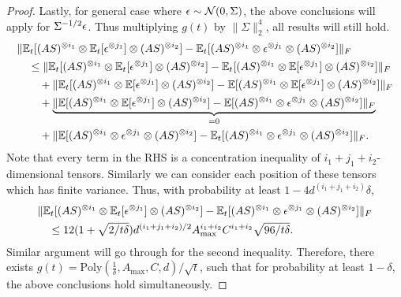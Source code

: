 \begin{proof}
	Lastly, for general case where $\epsilon\sim {\cal{N}}(0,\Sigma)$, the above conclusions will apply for $\Sigma^{-1/2}\epsilon$. Thus multiplying  $g(t)$ by $ \|\Sigma\|^4_2$, all results will still hold. 
	\begin{align*}
	&\|\mathbb{E}_t[(AS)^{\otimes i_1}\otimes \mathbb{E}_t[\epsilon^{\otimes j_1}] \otimes (AS)^{\otimes i_2}] - \mathbb{E}_t[(AS)^{\otimes i_1}\otimes \epsilon^{\otimes j_1}\otimes (AS)^{\otimes i_2}]  \|_F \\
	& \quad \le  \|\mathbb{E}_t[(AS)^{\otimes i_1}\otimes \mathbb{E}_t[\epsilon^{\otimes j_1}] \otimes (AS)^{\otimes i_2}] - \mathbb{E}_t[(AS)^{\otimes i_1}\otimes \mathbb{E}[\epsilon^{\otimes j_1}] \otimes (AS)^{\otimes i_2}] \|_F \\
	& \quad \quad + \| \mathbb{E}_t[(AS)^{\otimes i_1}\otimes \mathbb{E}[\epsilon^{\otimes j_1}] \otimes (AS)^{\otimes i_2}] - \mathbb{E}[(AS)^{\otimes i_1}\otimes \mathbb{E}[\epsilon^{\otimes j_1}] \otimes (AS)^{\otimes i_2}] \|_F \\
	& \quad \quad + \underbrace{\|\mathbb{E}[(AS)^{\otimes i_1}\otimes \mathbb{E}[\epsilon^{\otimes j_1}] \otimes (AS)^{\otimes i_2}]  - \mathbb{E}[(AS)^{\otimes i_1}\otimes \epsilon^{\otimes j_1}\otimes (AS)^{\otimes i_2}] \|_F}_{=0} \\
	& \quad \quad + \| \mathbb{E}[(AS)^{\otimes i_1}\otimes \epsilon^{\otimes j_1}\otimes (AS)^{\otimes i_2}] - \mathbb{E}_t[(AS)^{\otimes i_1}\otimes \epsilon^{\otimes j_1}\otimes (AS)^{\otimes i_2}] \|_F.
	\end{align*}
	Note that every term in the RHS is a concentration inequality of $i_1+j_1+i_2$-dimensional tensors. Similarly we can consider each position of these tensors which has finite variance.
	Thus, with probability at least $1- 4d^{(i_1+j_1+i_2)}\delta$,   
	\begin{align*}
	& \|\mathbb{E}_t[(AS)^{\otimes i_1}\otimes \mathbb{E}_t[\epsilon^{\otimes j_1}] \otimes (AS)^{\otimes i_2}] - \mathbb{E}_t[(AS)^{\otimes i_1}\otimes \epsilon^{\otimes j_1}\otimes (AS)^{\otimes i_2}]  \|_F \\
	& \quad \le
	12(1+\sqrt{2/t\delta})d^{(i_1+j_1+i_2)/2}A_{\max}^{i_1+i_2}C^{i_1+i_2}\sqrt{96/t\delta}.  
	\end{align*}
	Similar argument will go through for the second inequality.
	Therefore, there exists $g(t) = \text{Poly}(\frac{1}{\delta}, A_{\max}, C, d)/\sqrt{t}$, such that for probability at least $1-\delta$, the above conclusions hold simultaneously.
	\fi
\end{proof}

